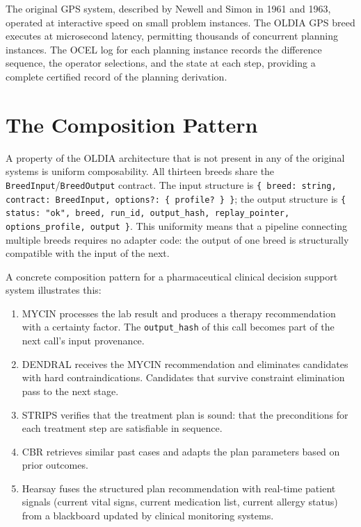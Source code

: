 The original GPS system, described by Newell and Simon in 1961 and 1963, operated
at interactive speed on small problem instances. The OLDIA GPS breed executes at
microsecond latency, permitting thousands of concurrent planning instances. The
OCEL log for each planning instance records the difference sequence, the operator
selections, and the state at each step, providing a complete certified record of
the planning derivation.

\section{The Composition Pattern}
\label{sec:composition}

A property of the OLDIA architecture that is not present in any of the original
systems is uniform composability. All thirteen breeds share the
\texttt{BreedInput}/\texttt{BreedOutput} contract. The input structure is
\texttt{\{ breed: string, contract: BreedInput, options?: \{ profile? \} \}};
the output structure is
\texttt{\{ status: "ok", breed, run\_id, output\_hash, replay\_pointer, options\_profile, output \}}.
This uniformity means that a pipeline connecting multiple breeds requires no
adapter code: the output of one breed is structurally compatible with the input
of the next.

A concrete composition pattern for a pharmaceutical clinical decision support
system illustrates this:

\begin{enumerate}
\item MYCIN processes the lab result and produces a therapy recommendation with a
certainty factor. The \texttt{output\_hash} of this call becomes part of the next
call's input provenance.

\item DENDRAL receives the MYCIN recommendation and eliminates candidates with
hard contraindications. Candidates that survive constraint elimination pass to
the next stage.

\item STRIPS verifies that the treatment plan is sound: that the preconditions for
each treatment step are satisfiable in sequence.

\item CBR retrieves similar past cases and adapts the plan parameters based on
prior outcomes.

\item Hearsay fuses the structured plan recommendation with real-time patient
signals (current vital signs, current medication list, current allergy status)
from a blackboard updated by clinical monitoring systems.

\end{enumerate}

